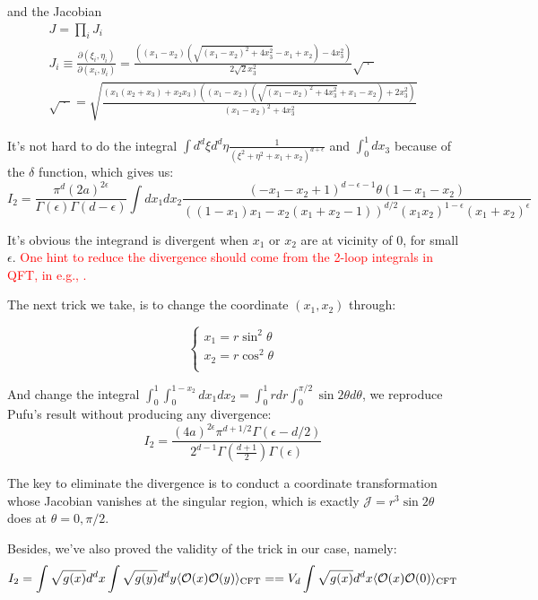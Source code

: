 \documentclass[12pt, a4paper]{article}
\numberwithin{equation}{section}
\newcommand{\be}{\begin{equation}}
\newcommand{\ee}{\end{equation}}
\newcommand{\cO}{\mathcal{O}}
\newcommand{\cJ}{\mathcal{J}}
\begin{document}
	and the Jacobian
\be
\begin{aligned}
	&J = \prod_i J_i&\\
	&J_i \equiv	\frac{\partial(\xi_i, \eta_i)}{\partial(x_i,y_i)} =\frac{\left((x_1-x_2)\left(\sqrt{(x_1-x_2)^2+4x_3^2}-x_1+x_2\right)-4x_3^2\right)}{2\sqrt{2} x_3^2}\sqrt{\;\cdot\;}&\\
&\sqrt{\;\cdot\;} = \sqrt{\frac{(x_1 (x_2+x_3)+x_2 x_3)\left((x_1-x_2)\left(\sqrt{(x_1-x_2)^2+4x_3^2}+x_1-x_2\right)+2x_3^2\right)}{(x_1-x_2)^2+4 x_3^2}}&
\end{aligned}
\ee

	It's not hard to do the integral $\int d^d \xi d^d \eta \frac{1}{\left(\xi^2+\eta^2 +x_1+x_2\right)^{d+\epsilon}}$ and $\int_0^1dx_3$ because of the $\delta$ function, which gives us:
\be
	I_2 =\frac{\pi ^d (2a)^{2 \epsilon } }{\Gamma (\epsilon ) \Gamma (d-\epsilon )} \int dx_1dx_2 \frac{ 
		 (-x_1-x_2+1)^{d-\epsilon -1} \theta (1-x_1-x_2) }{((1-x_1) x_1-x_2 (x_1+x_2-1))^{d/2}(x_1 x_2)^{1-\epsilon}(x_1+x_2)^{\epsilon } }
\ee

	It's obvious the integrand is divergent when $x_1$ or $x_2$ are at vicinity of 0, for small $\epsilon$. \textcolor{red}{One hint to reduce the divergence should come from the 2-loop integrals in QFT, in e.g., \cite{Grozin:2005qq}.}
	
	The next trick we take, is to change the coordinate $(x_1, x_2)$ through:

\be
\left\{
\begin{aligned}
	x_1 = r \sin^2\theta\\
	x_2 = r \cos^2\theta\\
\end{aligned}
\right.
\ee

	And change the integral $\int_0^1\int_0^{1-x_2}dx_1dx_2 = \int_0^1rdr\int_0^{\pi/2}\sin2\theta d\theta$, we reproduce Pufu's result without producing any divergence:
\be
	I_2 = \frac{(4a)^{2\epsilon}\pi^{d+1/2}\Gamma(\epsilon-d/2)}{2^{d-1}\Gamma\left(\frac{d+1}{2}\right)\Gamma(\epsilon)}
\ee

	The key to eliminate the divergence is to conduct a coordinate transformation whose Jacobian vanishes at the singular region, which is exactly $\cJ = r^3 \sin2\theta$ does at $\theta = 0, \pi/2$. 
	
	Besides, we've also proved the validity of the trick in our case, namely:
\be
	I_2 = \int\sqrt{g(x)}d^dx\int\sqrt{g(y)}d^dy\langle\cO(x)\cO(y)\rangle_{\rm CFT} == V_d\int\sqrt{g(x)}d^dx\langle\cO(x)\cO(0)\rangle_{\rm CFT}
\ee
\end{document}
